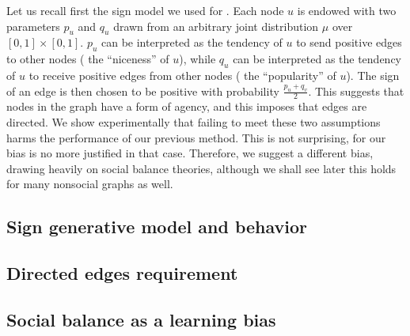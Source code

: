 Let us recall first the sign model we used for \dssn{}. Each node $u$ is endowed with two parameters
$p_u$ and $q_u$ drawn from an arbitrary joint distribution $\mu$ over $[0,1]\times [0,1]$. $p_u$ can be
interpreted as the tendency of $u$ to send positive edges to other nodes (\ie{} the
\enquote{niceness} of $u$), while $q_u$ can be interpreted as the tendency of $u$ to receive positive
edges from other nodes (\ie{} the \enquote{popularity} of $u$). The sign of an edge \euv{} is then
chosen to be positive with probability $\frac{p_u+q_v}{2}$. This suggests that nodes in the
graph have a form of agency, and this imposes that edges are directed. We show experimentally that
failing to meet these two assumptions harms the performance of our previous method. This is not
surprising, for our bias is no more justified in that case. Therefore, we suggest a different bias,
drawing heavily on social balance theories, although we shall see later this holds for many
nonsocial graphs as well.

\subsection{Sign generative model and behavior}
\label{sub:bias_sign_behavior}



\subsection{Directed edges requirement}
\label{sub:need_for_a_directed_graph}



\subsection{Social balance as a learning bias}
\label{sub:bias_balance}


